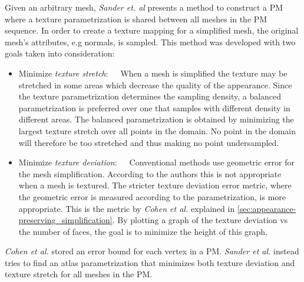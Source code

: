 Given an arbitrary mesh, \emph{Sander et. al} \cite{sander2001texture} presents a method to construct a PM where a texture parametrization is shared between all meshes in the PM sequence. In order to create a texture mapping for a simplified mesh, the original mesh's attributes, e.g normals, is sampled. This method was developed with two goals taken into consideration:
\begin{itemize}
\item{Minimize \emph{texture stretch}:}~~~When a mesh is simplified the texture may be stretched in some areas which decrease the quality of the appearance. Since the texture parametrization determines the sampling density, a balanced parametrization is preferred over one that samples with different density in different areas. The balanced parametrization is obtained by minimizing the largest texture stretch over all points in the domain. No point in the domain will therefore be too stretched and thus making no point undersampled. 
\item{Minimize \emph{texture deviation}:}~~~Conventional methods use geometric error for the mesh simplification. According to the authors this is not appropriate when a mesh is textured. The stricter texture deviation error metric, where the geometric error is measured according to the parametrization, is more appropriate. This is the metric by \emph{Cohen et al.} \cite{cohen1998appearance} explained in \cref{sec:appearance-preserving_simplification}. By plotting a graph of the texture deviation vs the number of faces, the goal is to minimize the height of this graph.
\end{itemize}

\emph{Cohen et al.} \cite{cohen1998appearance} stored an error bound for each vertex in a PM. \emph{Sander et al.} \cite{sander2001texture} instead tries to find an atlas parametrization that minimizes both texture deviation and texture stretch for all meshes in the PM.

